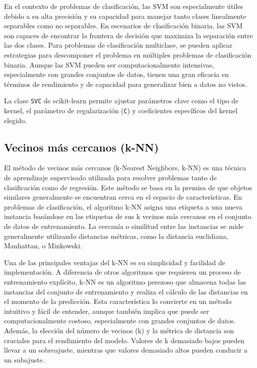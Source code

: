 En el contexto de problemas de clasificación, las SVM son especialmente útiles debido a su alta precisión y su capacidad para manejar tanto clases linealmente separables como no separables. En escenarios de clasificación binaria, las SVM son capaces de encontrar la frontera de decisión que maximiza la separación entre las dos clases. Para problemas de clasificación multiclase, se pueden aplicar estrategias para descomponer el problema en múltiples problemas de clasificación binaria. Aunque las SVM pueden ser computacionalmente intensivas, especialmente con grandes conjuntos de datos, tienen una gran eficacia en términos de rendimiento y de capacidad para generalizar bien a datos no vistos.

La clase \texttt{SVC} \cite{sk-svm} de scikit-learn permite ajustar parámetros clave como el tipo de kernel, el parámetro de regularización (\texttt{C}) y coeficientes específicos del kernel elegido.

\subsection{Vecinos más cercanos (k-NN)}

El método de vecinos más cercanos (k-Nearest Neighbors, k-NN) es una técnica de aprendizaje supervisado utilizada para resolver problemas tanto de clasificación como de regresión. Este método se basa en la premisa de que objetos similares generalmente se encuentran cerca en el espacio de características. En problemas de clasificación, el algoritmo k-NN asigna una etiqueta a una nueva instancia basándose en las etiquetas de sus k vecinos más cercanos en el conjunto de datos de entrenamiento. La cercanía o similitud entre las instancias se mide generalmente utilizando distancias métricas, como la distancia euclidiana, Manhattan, o Minkowski.

Una de las principales ventajas del k-NN es su simplicidad y facilidad de implementación. A diferencia de otros algoritmos que requieren un proceso de entrenamiento explícito, k-NN es un algoritmo perezoso que almacena todas las instancias del conjunto de entrenamiento y realiza el cálculo de las distancias en el momento de la predicción. Esta característica lo convierte en un método intuitivo y fácil de entender, aunque también implica que puede ser computacionalmente costoso, especialmente con grandes conjuntos de datos. Además, la elección del número de vecinos (k) y la métrica de distancia son cruciales para el rendimiento del modelo. Valores de k demasiado bajos pueden llevar a un sobreajuste, mientras que valores demasiado altos pueden conducir a un subajuste.


